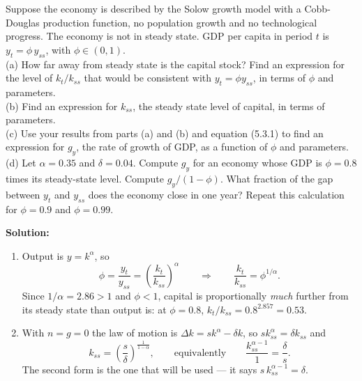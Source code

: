 \documentclass[12pt, letterpaper]{article}
\begin{document}
\begin{tcolorbox}[evenbox,title={Problem 5.2 \quad The Speed of Convergence}]
\begin{tcolorbox}[questionbox]
Suppose the economy is described by the Solow growth model with a Cobb-Douglas production
function, no population growth and no technological progress. The economy is not in steady
state. GDP per capita in period $t$ is $y_t=\phi\,y_{ss}$, with $\phi\in(0,1)$.\\[3pt]
(a) How far away from steady state is the capital stock? Find an expression for the level of
$k_t/k_{ss}$ that would be consistent with $y_t=\phi y_{ss}$, in terms of $\phi$ and
parameters.\\[3pt]
(b) Find an expression for $k_{ss}$, the steady state level of capital, in terms of
parameters.\\[3pt]
(c) Use your results from parts (a) and (b) and equation (5.3.1) to find an expression for
$g_y$, the rate of growth of GDP, as a function of $\phi$ and parameters.\\[3pt]
(d) Let $\alpha=0.35$ and $\delta=0.04$. Compute $g_y$ for an economy whose GDP is
$\phi=0.8$ times its steady-state level. Compute $g_y/(1-\phi)$. What fraction of the gap
between $y_t$ and $y_{ss}$ does the economy close in one year? Repeat this calculation for
$\phi=0.9$ and $\phi=0.99$.
\end{tcolorbox}

\textbf{Solution:}
\begin{enumerate}

\item Output is $y=k^{\alpha}$, so
\[
\phi=\frac{y_t}{y_{ss}}=\left(\frac{k_t}{k_{ss}}\right)^{\alpha}
\qquad\Longrightarrow\qquad
\boxed{\frac{k_t}{k_{ss}}=\phi^{1/\alpha}} .
\]
Since $1/\alpha=2.86>1$ and $\phi<1$, capital is proportionally \emph{much} further from its
steady state than output is: at $\phi=0.8$, $k_t/k_{ss}=0.8^{2.857}=0.53$.

\item With $n=g=0$ the law of motion is $\Delta k=s k^{\alpha}-\delta k$, so
$s k_{ss}^{\alpha}=\delta k_{ss}$ and
\[
\boxed{k_{ss}=\left(\frac{s}{\delta}\right)^{\frac{1}{1-\alpha}}} ,
\qquad\text{equivalently}\qquad
\frac{k_{ss}^{\alpha-1}}{1}=\frac{\delta}{s}.
\tag{5.2.b}
\]
The second form is the one that will be used --- it says $s\,k_{ss}^{\alpha-1}=\delta$.


\end{enumerate}
\end{tcolorbox}
\end{document}
